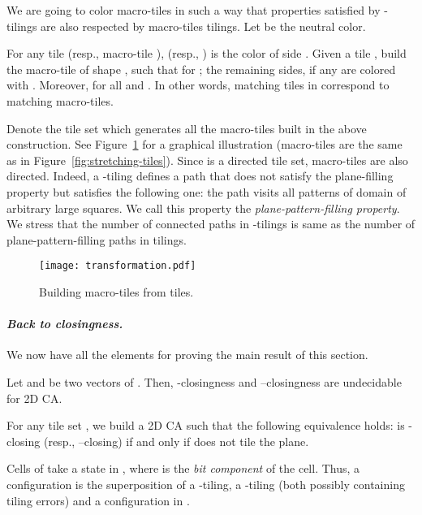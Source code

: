 \documentclass{llncs}
\begin{document}
We are going to color macro-tiles in
such a way that properties satisfied by -tilings are also respected
by macro-tiles tilings. Let  be the neutral color.

For any tile  (resp., macro-tile ),  (resp., ) is the
color of side .
Given a tile , build the macro-tile  of shape ,
such that  for ; the remaining sides, if any are colored with 
.  Moreover,  for all  and
.
In other words, matching tiles in  correspond to matching macro-tiles. 

Denote   the tile set which generates all the 
macro-tiles built in the above construction. See 
Figure~\ref{fig:tiles-macro-tiles} for a graphical illustration  
(macro-tiles are the same as in  Figure~\ref{fig:stretching-tiles}).
Since  is a directed tile set, macro-tiles are also directed. 
Indeed, a -tiling  defines a path that does not satisfy the plane-filling 
property but satisfies the following one:  the path visits all
patterns of domain  of arbitrary  large squares. 
We call this property the \emph{plane-pattern-filling property}.
We stress that the number of connected paths in -tilings is same as the number
of plane-pattern-filling paths in  tilings.

\begin{figure}
\begin{center}
\texttt{[image: transformation.pdf]}
\end{center}
\caption{Building macro-tiles from tiles.}
\label{fig:tiles-macro-tiles}
\end{figure}

\paragraph{\emph{Back to closingness.}} We now have all the 
elements for proving the main result of this section.

\begin{theorem}\label{th:closingundec}
Let  and  be two vectors of . Then, -closingness and --closingness are undecidable for 2D CA.
\end{theorem}
\proof
For any tile set , we build a 2D CA
 such that the following equivalence holds:  is -closing
(resp., --closing) if and only if  does not tile the plane.

Cells of  take a state in , where
 is the \emph{bit component} of the cell. Thus, a
configuration is the superposition of a -tiling, a -tiling (both possibly containing tiling errors) and a configuration in .
\end{document}
